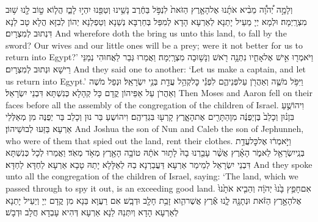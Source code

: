 {וְלָמָ֣ה יְ֠הֹוָ֠ה מֵבִ֨יא אֹתָ֜נוּ אֶל\maqqaf הָאָ֤רֶץ הַזֹּאת֙ לִנְפֹּ֣ל בַּחֶ֔רֶב נָשֵׁ֥ינוּ וְטַפֵּ֖נוּ יִהְי֣וּ לָבַ֑ז הֲל֧וֹא ט֦וֹב לָ֖נוּ שׁ֥וּב מִצְרָֽיְמָה׃}
{וּלְמָא יְיָ מַעֵיל יָתַנָא לְאַרְעָא הָדָא לְמִפַּל בְּחַרְבָּא נְשַׁנָא וְטַפְלַנָא יְהוֹן לְבִזָּא הֲלָא טָב לַנָא דִּנְתוּב לְמִצְרָיִם׃}
{And wherefore doth the \lord\space bring us unto this land, to fall by the sword? Our wives and our little ones will be a prey; were it not better for us to return into Egypt?’}{}
{וַיֹּאמְר֖וּ אִ֣ישׁ אֶל\maqqaf אָחִ֑יו נִתְּנָ֥ה רֹ֖אשׁ וְנָשׁ֥וּבָה מִצְרָֽיְמָה׃}
{וַאֲמַרוּ גְּבַר לַאֲחוּהִי נְמַנֵּי רֵישָׁא וּנְתוּב לְמִצְרָיִם׃}
{And they said one to another: ‘Let us make a captain, and let us return into Egypt.’}{}
{וַיִּפֹּ֥ל מֹשֶׁ֛ה וְאַהֲרֹ֖ן עַל\maqqaf פְּנֵיהֶ֑ם לִפְנֵ֕י כׇּל\maqqaf קְהַ֥ל עֲדַ֖ת בְּנֵ֥י יִשְׂרָאֵֽל׃}
{וּנְפַל מֹשֶׁה וְאַהֲרֹן עַל אַפֵּיהוֹן קֳדָם כָּל קְהָלָא כְּנִשְׁתָּא דִּבְנֵי יִשְׂרָאֵל׃}
{Then Moses and Aaron fell on their faces before all the assembly of the congregation of the children of Israel.}{}
{וִיהוֹשֻׁ֣עַ בִּן\maqqaf נ֗וּן וְכָלֵב֙ בֶּן\maqqaf יְפֻנֶּ֔ה מִן\maqqaf הַתָּרִ֖ים אֶת\maqqaf הָאָ֑רֶץ קָרְע֖וּ בִּגְדֵיהֶֽם׃}
{וִיהוֹשֻעַ בַּר נוּן וְכָלֵב בַּר יְפֻנֶּה מִן מְאַלְּלֵי אַרְעָא בַּזַּעוּ לְבוּשֵׁיהוֹן׃}
{And Joshua the son of Nun and Caleb the son of Jephunneh, who were of them that spied out the land, rent their clothes.}{}
{וַיֹּ֣אמְר֔וּ אֶל\maqqaf כׇּל\maqqaf עֲדַ֥ת בְּנֵֽי\maqqaf יִשְׂרָאֵ֖ל לֵאמֹ֑ר הָאָ֗רֶץ אֲשֶׁ֨ר עָבַ֤רְנוּ בָהּ֙ לָת֣וּר אֹתָ֔הּ טוֹבָ֥ה הָאָ֖רֶץ מְאֹ֥ד מְאֹֽד׃}
{וַאֲמַרוּ לְכָל כְּנִשְׁתָּא דִּבְנֵי יִשְׂרָאֵל לְמֵימַר אַרְעָא דַּעֲבַרְנָא בַהּ לְאַלָּלָא יָתַהּ טָבָא אַרְעָא לַחְדָּא לַחְדָּא׃}
{And they spoke unto all the congregation of the children of Israel, saying: ‘The land, which we passed through to spy it out, is an exceeding good land.}{}
{אִם\maqqaf חָפֵ֥ץ בָּ֙נוּ֙ יְהֹוָ֔ה וְהֵבִ֤יא אֹתָ֙נוּ֙ אֶל\maqqaf הָאָ֣רֶץ הַזֹּ֔את וּנְתָנָ֖הּ לָ֑נוּ אֶ֕רֶץ אֲשֶׁר\maqqaf הִ֛וא זָבַ֥ת חָלָ֖ב וּדְבָֽשׁ׃}
{אִם רַעֲוָא בַּנָא מִן קֳדָם יְיָ וְיַעֵיל יָתַנָא לְאַרְעָא הָדָא וְיִתְּנַהּ לַנָא אַרְעָא דְּהִיא עָבְדָא חֲלָב וּדְבָשׁ׃}
